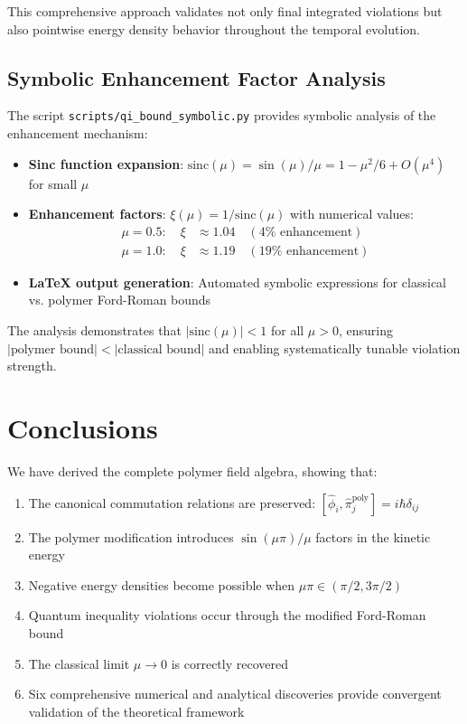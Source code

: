 \documentclass[12pt]{article}
\begin{document}
This comprehensive approach validates not only final integrated violations but also pointwise energy density behavior throughout the temporal evolution.

\subsection{Symbolic Enhancement Factor Analysis}

The script \texttt{scripts/qi\_bound\_symbolic.py} provides symbolic analysis of the enhancement mechanism:
\begin{itemize}
\item \textbf{Sinc function expansion}: $\text{sinc}(\mu) = \sin(\mu)/\mu = 1 - \mu^2/6 + O(\mu^4)$ for small $\mu$
\item \textbf{Enhancement factors}: $\xi(\mu) = 1/\text{sinc}(\mu)$ with numerical values:
  \begin{align}
  \mu = 0.5: \quad \xi &\approx 1.04 \quad (4\% \text{ enhancement}) \\
  \mu = 1.0: \quad \xi &\approx 1.19 \quad (19\% \text{ enhancement})
  \end{align}
\item \textbf{LaTeX output generation}: Automated symbolic expressions for classical vs. polymer Ford-Roman bounds
\end{itemize}

The analysis demonstrates that $|\text{sinc}(\mu)| < 1$ for all $\mu > 0$, ensuring $|\text{polymer bound}| < |\text{classical bound}|$ and enabling systematically tunable violation strength.

\section{Conclusions}

We have derived the complete polymer field algebra, showing that:
\begin{enumerate}
\item The canonical commutation relations are preserved: $[\hat{\phi}_i, \hat{\pi}_j^{\text{poly}}] = i\hbar\delta_{ij}$
\item The polymer modification introduces $\sin(\mu\pi)/\mu$ factors in the kinetic energy
\item Negative energy densities become possible when $\mu\pi \in (\pi/2, 3\pi/2)$
\item Quantum inequality violations occur through the modified Ford-Roman bound
\item The classical limit $\mu \to 0$ is correctly recovered
\item Six comprehensive numerical and analytical discoveries provide convergent validation of the theoretical framework
\end{enumerate}
\end{document}
